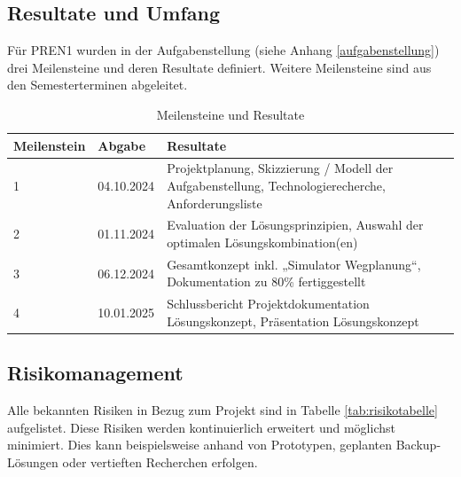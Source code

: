 \documentclass[../main.tex]{subfiles}
\begin{document}
\subsection{Resultate und Umfang}
Für PREN1 wurden in der Aufgabenstellung (siehe Anhang \ref{aufgabenstellung}) drei Meilensteine und deren Resultate definiert. Weitere Meilensteine sind aus den Semesterterminen abgeleitet.
\begin{table}[H]
\centering
\begin{tabular}{|l|l|p{10cm}|}
\hline
\textbf{Meilenstein} & \textbf{Abgabe} & \textbf{Resultate} \\ \hline
 1        & 04.10.2024      & Projektplanung, Skizzierung / Modell der Aufgabenstellung, Technologierecherche, Anforderungsliste \\ \hline
 2        & 01.11.2024      & Evaluation der Lösungsprinzipien, Auswahl der optimalen Lösungskombination(en) \\ \hline
 3        & 06.12.2024      & Gesamtkonzept inkl. „Simulator Wegplanung“, Dokumentation zu 80\% fertiggestellt \\ \hline
 4        & 10.01.2025      &  Schlussbericht Projektdokumentation Lösungskonzept, Präsentation Lösungskonzept\\ \hline 
 
\end{tabular}
\caption{Meilensteine und Resultate}
\label{tab:meilensteine}
\end{table}


\subsection{Risikomanagement} \label{risikomatrix}

Alle bekannten Risiken in Bezug zum Projekt sind in Tabelle \ref{tab:risikotabelle} aufgelistet. Diese Risiken werden kontinuierlich erweitert und möglichst minimiert. Dies kann beispielsweise anhand von Prototypen, geplanten Backup-Lösungen oder vertieften Recherchen erfolgen.
\end{document}
